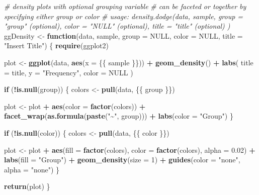 \documentclass[
]{article}
\newenvironment{Shaded}{\begin{snugshade}}{\end{snugshade}}
\newcommand{\AttributeTok}[1]{\textcolor[rgb]{0.13,0.29,0.53}{#1}}
\newcommand{\CommentTok}[1]{\textcolor[rgb]{0.56,0.35,0.01}{\textit{#1}}}
\newcommand{\ConstantTok}[1]{\textcolor[rgb]{0.56,0.35,0.01}{#1}}
\newcommand{\ControlFlowTok}[1]{\textcolor[rgb]{0.13,0.29,0.53}{\textbf{#1}}}
\newcommand{\DecValTok}[1]{\textcolor[rgb]{0.00,0.00,0.81}{#1}}
\newcommand{\FloatTok}[1]{\textcolor[rgb]{0.00,0.00,0.81}{#1}}
\newcommand{\FunctionTok}[1]{\textcolor[rgb]{0.13,0.29,0.53}{\textbf{#1}}}
\newcommand{\NormalTok}[1]{#1}
\newcommand{\OtherTok}[1]{\textcolor[rgb]{0.56,0.35,0.01}{#1}}
\newcommand{\SpecialCharTok}[1]{\textcolor[rgb]{0.81,0.36,0.00}{\textbf{#1}}}
\newcommand{\StringTok}[1]{\textcolor[rgb]{0.31,0.60,0.02}{#1}}
\begin{document}
\begin{Shaded}
\begin{Highlighting}[]
\CommentTok{\# density plots with optional grouping variable}
\CommentTok{\# can be faceted or together by specifying either group or color}
\CommentTok{\# usage: density.dodge(data, sample, group = "group" (optional), color = "NULL" (optional), title = "title" (optional) )}
\NormalTok{ggDensity }\OtherTok{\textless{}{-}} \ControlFlowTok{function}\NormalTok{(data, sample, }\AttributeTok{group =} \ConstantTok{NULL}\NormalTok{, }\AttributeTok{color =} \ConstantTok{NULL}\NormalTok{, }\AttributeTok{title =} \StringTok{"Insert Title"}\NormalTok{) \{}
  \FunctionTok{require}\NormalTok{(ggplot2)}

\NormalTok{  plot }\OtherTok{\textless{}{-}} \FunctionTok{ggplot}\NormalTok{(data, }\FunctionTok{aes}\NormalTok{(}\AttributeTok{x =}\NormalTok{ \{\{ sample \}\})) }\SpecialCharTok{+}
    \FunctionTok{geom\_density}\NormalTok{() }\SpecialCharTok{+}
    \FunctionTok{labs}\NormalTok{(}
      \AttributeTok{title =}\NormalTok{ title,}
      \AttributeTok{y =} \StringTok{"Frequency"}\NormalTok{,}
      \AttributeTok{color =} \ConstantTok{NULL}
\NormalTok{    )}

  \ControlFlowTok{if}\NormalTok{ (}\SpecialCharTok{!}\FunctionTok{is.null}\NormalTok{(group)) \{}
\NormalTok{    colors }\OtherTok{\textless{}{-}} \FunctionTok{pull}\NormalTok{(data, \{\{ group \}\})}

\NormalTok{    plot }\OtherTok{\textless{}{-}}\NormalTok{ plot }\SpecialCharTok{+} \FunctionTok{aes}\NormalTok{(}\AttributeTok{color =} \FunctionTok{factor}\NormalTok{(colors)) }\SpecialCharTok{+}
      \FunctionTok{facet\_wrap}\NormalTok{(}\FunctionTok{as.formula}\NormalTok{(}\FunctionTok{paste}\NormalTok{(}\StringTok{"\textasciitilde{}"}\NormalTok{, group))) }\SpecialCharTok{+}
      \FunctionTok{labs}\NormalTok{(}\AttributeTok{color =} \StringTok{"Group"}\NormalTok{)}
\NormalTok{  \}}

  \ControlFlowTok{if}\NormalTok{ (}\SpecialCharTok{!}\FunctionTok{is.null}\NormalTok{(color)) \{}
\NormalTok{    colors }\OtherTok{\textless{}{-}} \FunctionTok{pull}\NormalTok{(data, \{\{ color \}\})}

\NormalTok{    plot }\OtherTok{\textless{}{-}}\NormalTok{ plot }\SpecialCharTok{+} \FunctionTok{aes}\NormalTok{(}\AttributeTok{fill =} \FunctionTok{factor}\NormalTok{(colors), }\AttributeTok{color =} \FunctionTok{factor}\NormalTok{(colors), }\AttributeTok{alpha =} \FloatTok{0.02}\NormalTok{) }\SpecialCharTok{+}
      \FunctionTok{labs}\NormalTok{(}\AttributeTok{fill =} \StringTok{"Group"}\NormalTok{) }\SpecialCharTok{+}
      \FunctionTok{geom\_density}\NormalTok{(}\AttributeTok{size =} \DecValTok{1}\NormalTok{) }\SpecialCharTok{+}
      \FunctionTok{guides}\NormalTok{(}\AttributeTok{color =} \StringTok{"none"}\NormalTok{, }\AttributeTok{alpha =} \StringTok{"none"}\NormalTok{)}
\NormalTok{  \}}

  \FunctionTok{return}\NormalTok{(plot)}
\NormalTok{\}}
\end{Highlighting}
\end{Shaded}
\end{document}
